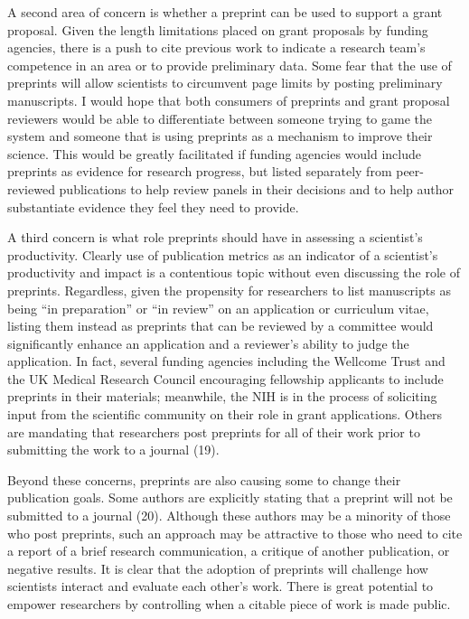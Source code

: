\documentclass[11pt,]{article}
\begin{document}
A second area of concern is whether a preprint can be used to support a
grant proposal. Given the length limitations placed on grant proposals
by funding agencies, there is a push to cite previous work to indicate a
research team's competence in an area or to provide preliminary data.
Some fear that the use of preprints will allow scientists to circumvent
page limits by posting preliminary manuscripts. I would hope that both
consumers of preprints and grant proposal reviewers would be able to
differentiate between someone trying to game the system and someone that
is using preprints as a mechanism to improve their science. This would
be greatly facilitated if funding agencies would include preprints as
evidence for research progress, but listed separately from peer-reviewed
publications to help review panels in their decisions and to help author
substantiate evidence they feel they need to provide.

A third concern is what role preprints should have in assessing a
scientist's productivity. Clearly use of publication metrics as an
indicator of a scientist's productivity and impact is a contentious
topic without even discussing the role of preprints. Regardless, given
the propensity for researchers to list manuscripts as being ``in
preparation'' or ``in review'' on an application or curriculum vitae,
listing them instead as preprints that can be reviewed by a committee
would significantly enhance an application and a reviewer's ability to
judge the application. In fact, several funding agencies including the
Wellcome Trust and the UK Medical Research Council encouraging
fellowship applicants to include preprints in their materials;
meanwhile, the NIH is in the process of soliciting input from the
scientific community on their role in grant applications. Others are
mandating that researchers post preprints for all of their work prior to
submitting the work to a journal (19).

Beyond these concerns, preprints are also causing some to change their
publication goals. Some authors are explicitly stating that a preprint
will not be submitted to a journal (20). Although these authors may be a
minority of those who post preprints, such an approach may be attractive
to those who need to cite a report of a brief research communication, a
critique of another publication, or negative results. It is clear that
the adoption of preprints will challenge how scientists interact and
evaluate each other's work. There is great potential to empower
researchers by controlling when a citable piece of work is made public.
\end{document}
